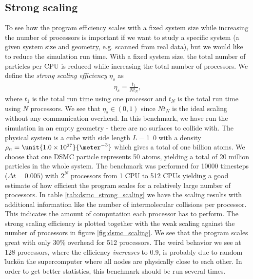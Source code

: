 \subsection{Strong scaling}
To see how the program efficiency scales with a fixed system size while increasing the number of processors is important if we want to study a specific system (a given system size and geometry, e.g. scanned from real data), but we would like to reduce the simulation run time. With a fixed system size, the total number of particles per CPU is reduced while increasing the total number of processors. We define the \textit{strong scaling efficiency} $\eta_s$ as
\begin{align}
	\eta_s = \frac{t_1}{Nt_N},
\end{align}
where $t_1$ is the total run time using one processor and $t_N$ is the total run time using $N$ processors. We see that $\eta_s\in (0,1)$ since $Nt_N$ is the ideal scaling without any communication overhead. In this benchmark, we have run the simulation in an empty geometry - there are no surfaces to collide with. The physical system is a cube with side length $L=$\unit{1.0}{\micro\meter} with a density $\rho_n=\unit{1.0\e{27}}{\meter^{-3}}$ which gives a total of one billion atoms. We choose that one DSMC particle represents 50 atoms, yielding a total of 20 million particles in the whole system. The benchmark was performed for 10000 timesteps ($\Delta t = 0.005$) with $2^N$ processors from 1 CPU to 512 CPUs yielding a good estimate of how efficient the program scales for a relatively large number of processors. In table \ref{tab:dsmc_strong_scaling} we have the scaling results with additional information like the number of intermolecular collisions per processor. This indicates the amount of computation each processor has to perform. The strong scaling efficiency is plotted together with the weak scaling against the number of processors in figure \ref{fig:dsmc_scaling}. We see that the program scales great with only 30\% overhead for 512 processors. The weird behavior we see at 128 processors, where the efficiency \textit{increases} to 0.9, is probably due to random \"luck\" on the supercomputer where all nodes are physically close to each other. In order to get better statistics, this benchmark should be run several times.
